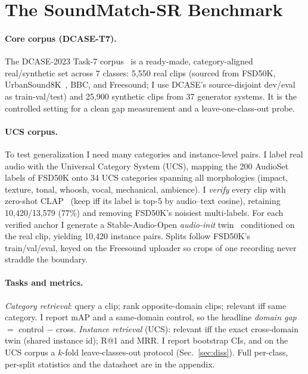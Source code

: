 \documentclass{article}
\begin{document}
\section{The SoundMatch-SR Benchmark}
\label{sec:bench}
\paragraph{Core corpus (DCASE-T7).} The DCASE-2023 Task-7 corpus~\citep{choi2023foley} is a
ready-made, category-aligned real/synthetic set across 7 classes: 5{,}550 real clips (sourced from
FSD50K, UrbanSound8K~\citep{salamon2014urbansound}, BBC, and Freesound; I use DCASE's source-disjoint
dev/eval as train-val/test) and 25{,}900 synthetic clips from 37 generator systems. It is the
controlled setting for a clean gap measurement and a leave-one-class-out probe.

\paragraph{UCS corpus.} To test generalization I need many categories and instance-level pairs. I
label real audio with the Universal Category System (UCS), mapping the 200 AudioSet~\citep{gemmeke2017audioset}
labels of FSD50K onto 34 UCS categories spanning all morphologies (impact, texture, tonal, whoosh,
vocal, mechanical, ambience). I \emph{verify} every clip with zero-shot CLAP~\citep{wu2023clap}
(keep iff its label is top-5 by audio--text cosine), retaining 10{,}420/13{,}579 ($77\%$) and
removing FSD50K's noisiest multi-labels. For each verified anchor I generate a Stable-Audio-Open
\emph{audio-init} twin~\citep{evans2024stableaudioopen} conditioned on the real clip, yielding
10{,}420 instance pairs. Splits follow FSD50K's train/val/eval, keyed on the Freesound uploader so
crops of one recording never straddle the boundary.

\paragraph{Tasks and metrics.} \emph{Category retrieval}: query a clip; rank opposite-domain clips;
relevant iff same category. I report mAP and a same-domain control, so the headline \emph{domain
gap} $=$ control $-$ cross. \emph{Instance retrieval} (UCS): relevant iff the exact cross-domain
twin (shared instance id); R@1 and MRR. I report bootstrap CIs, and on the UCS corpus a $k$-fold
leave-classes-out protocol (Sec.~\ref{sec:diss}). Full per-class, per-split statistics and the
datasheet are in the appendix.
\end{document}
